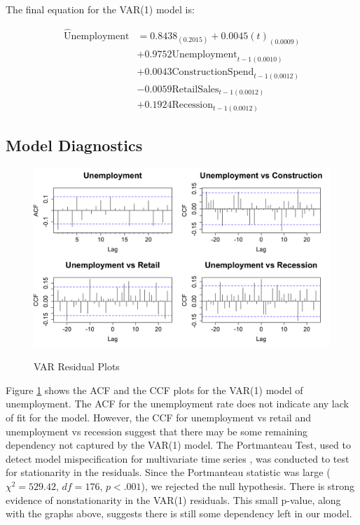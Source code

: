 \documentclass[twoside,twocolumn]{article}
\begin{document}
The final equation for the VAR(1) model is:
 
 \begin{align*}
  \widehat{\text{U}}\text{nemployment} &= 0.8438_{(0.2015)} +
  0.0045(t)_{(0.0009)}\\ 		
  &+ 0.9752\text{Unemployment}_{t-1 (0.0010)}\\
  &+ 0.0043\text{ConstructionSpend}_{t-1(0.0012)}\\
  &- 0.0059\text{RetailSales}_{t-1(0.0012)}\\
  &+ 0.1924\text{Recession}_{t-1(0.0012)}
  \end{align*} 
 
 \subsection{Model Diagnostics}
 \begin{figure}[hbt]
	\centering
	\caption{VAR Residual Plots}
	\includegraphics[width=\linewidth]{images/CCFplots}
	\label{fig:CCF}
\end{figure}

Figure \ref{fig:CCF} shows the ACF and the CCF plots for the VAR(1) model of unemployment.  The ACF for the unemployment rate does not indicate any lack of fit for the model. However, the CCF for unemployment vs retail and unemployment vs recession suggest that there may be some remaining dependency not captured by the VAR(1) model.   The Portmanteau Test, used to detect model mispecification for multivariate time series \citep{davies1979}, was conducted to test for stationarity in the residuals. Since the Portmanteau statistic was large (\(\chi^2=529.42\), \(df = 176\), \(p < .001\)), we rejected the null hypothesis. There is  strong evidence of nonstationarity in the VAR(1) residuals. This small p-value, along with the graphs above, suggests there is still some dependency left in our model.
\end{document}
